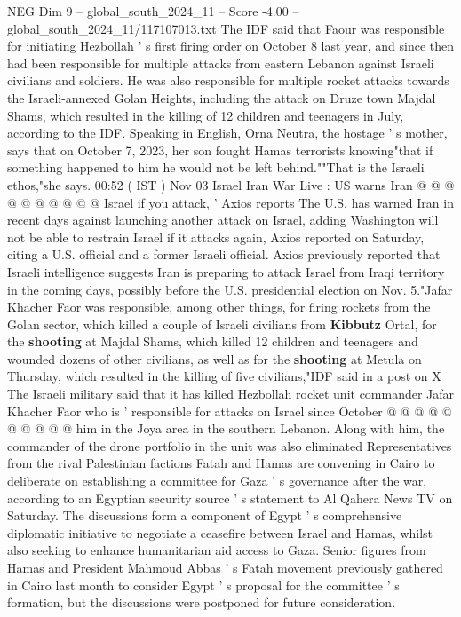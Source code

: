 \begin{textsample}{NEG Dim 9 – global\_south\_2024\_11 – Score -4.00 – global\_south\_2024\_11/117107013.txt}
The IDF said that Faour was responsible for initiating Hezbollah ' s first firing order on October 8 last year, and since then had been responsible for multiple attacks from eastern Lebanon against Israeli civilians and soldiers.
He was also responsible for multiple rocket attacks towards the Israeli-annexed Golan Heights, including the attack on Druze town Majdal Shams, which resulted in the killing of 12 children and teenagers in July, according to the IDF.
Speaking in English, Orna Neutra, the hostage ' s mother, says that on October 7, 2023, her son fought Hamas terrorists knowing"that if something happened to him he would not be left behind.""That is the Israeli ethos,"she says. 00:52 ( IST ) Nov 03 Israel Iran War Live : US warns Iran @ @ @ @ @ @ @ @ @ @ Israel if you attack, ' Axios reports The U.S. has warned Iran in recent days against launching another attack on Israel, adding Washington will not be able to restrain Israel if it attacks again, Axios reported on Saturday, citing a U.S. official and a former Israeli official.
Axios previously reported that Israeli intelligence suggests Iran is preparing to attack Israel from Iraqi territory in the coming days, possibly before the U.S. presidential election on Nov. 5."Jafar Khacher Faor was responsible, among other things, for firing rockets from the Golan sector, which killed a couple of Israeli civilians from \textbf{Kibbutz} Ortal, for the \textbf{shooting} at Majdal Shams, which killed 12 children and teenagers and wounded dozens of other civilians, as well as for the \textbf{shooting} at Metula on Thursday, which resulted in the killing of five civilians,"IDF said in a post on X The Israeli military said that it has killed Hezbollah rocket unit commander Jafar Khacher Faor who is ' responsible for attacks on Israel since October @ @ @ @ @ @ @ @ @ @ him in the Joya area in the southern Lebanon.
Along with him, the commander of the drone portfolio in the unit was also eliminated Representatives from the rival Palestinian factions Fatah and Hamas are convening in Cairo to deliberate on establishing a committee for Gaza ' s governance after the war, according to an Egyptian security source ' s statement to Al Qahera News TV on Saturday.
The discussions form a component of Egypt ' s comprehensive diplomatic initiative to negotiate a ceasefire between Israel and Hamas, whilst also seeking to enhance humanitarian aid access to Gaza.
Senior figures from Hamas and President Mahmoud Abbas ' s Fatah movement previously gathered in Cairo last month to consider Egypt ' s proposal for the committee ' s formation, but the discussions were postponed for future consideration.

\end{textsample}
